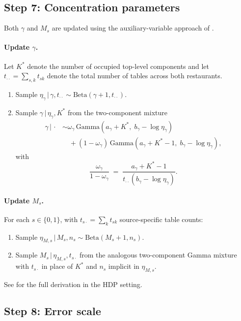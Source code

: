 \documentclass[11pt]{article}
\newcommand{\given}{\,|\,}
\newcommand{\1}{\mathbf{1}}
\begin{document}
\subsection{Step 7: Concentration parameters}

Both $\gamma$ and $M_s$ are updated using the auxiliary-variable approach of \citet{escobar1995bayesian}.

\paragraph{Update $\gamma$.} Let $K^*$ denote the number of occupied top-level components and let $t_{\cdot\cdot} = \sum_{s,k} t_{sk}$ denote the total number of tables across both restaurants.
\begin{enumerate}[noitemsep]
\item Sample $\eta_\gamma \given \gamma, t_{\cdot\cdot} \sim \mathrm{Beta}(\gamma + 1, t_{\cdot\cdot})$.
\item Sample $\gamma \given \eta_\gamma, K^*$ from the two-component mixture
\begin{align*}
\gamma \given \cdot &\sim \omega_\gamma\, \mathrm{Gamma}(a_\gamma + K^*,\; b_\gamma - \log \eta_\gamma) \\
&\quad + (1 - \omega_\gamma)\, \mathrm{Gamma}(a_\gamma + K^* - 1,\; b_\gamma - \log \eta_\gamma),
\end{align*}
with
$$\frac{\omega_\gamma}{1 - \omega_\gamma} \;=\; \frac{a_\gamma + K^* - 1}{t_{\cdot\cdot}(b_\gamma - \log \eta_\gamma)}.$$
\end{enumerate}

\paragraph{Update $M_s$.} For each $s \in \{0, 1\}$, with $t_{s\cdot} = \sum_k t_{sk}$ source-specific table counts:
\begin{enumerate}[noitemsep]
\item Sample $\eta_{M,s} \given M_s, n_s \sim \mathrm{Beta}(M_s + 1, n_s)$.
\item Sample $M_s \given \eta_{M,s}, t_{s\cdot}$ from the analogous two-component Gamma mixture with $t_{s\cdot}$ in place of $K^*$ and $n_s$ implicit in $\eta_{M,s}$.
\end{enumerate}
See \citet[Appendix A]{teh2006hierarchical} for the full derivation in the HDP setting.

\subsection{Step 8: Error scale}
\end{document}
